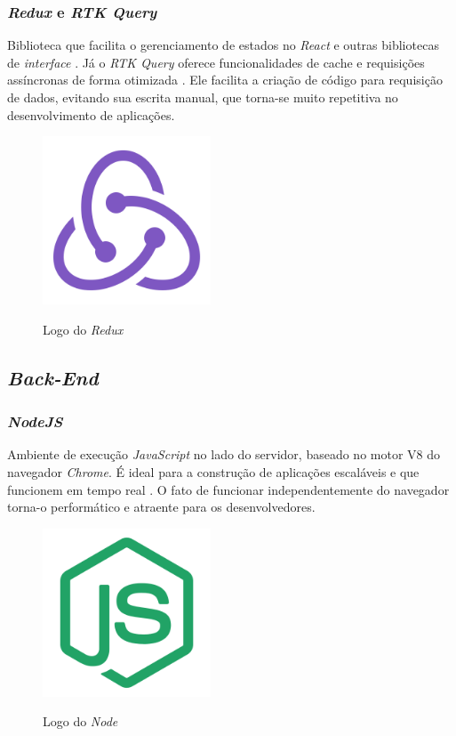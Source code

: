 \subsubsection{\emph{Redux} e \emph{RTK Query}} 
Biblioteca que facilita o gerenciamento de estados no \emph{React} e outras bibliotecas de \emph{interface }\cite{redux}. Já o \emph{RTK Query} oferece funcionalidades de cache e requisições assíncronas de forma otimizada \cite{rtk-query}. Ele facilita a criação de código para requisição de dados, evitando sua escrita manual, que torna-se muito repetitiva no desenvolvimento de aplicações. 

\begin{figure}[htb]
	\centering
	\caption{Logo do \emph{Redux}}
	\includegraphics[width=5cm]{cap04-desenvolvimento/images/4-4-1-3-redux-logo.png}
	\label{fig:redux-logo}
\end{figure}
\FloatBarrier

\subsection{\emph{Back-End}} 

\subsubsection{\emph{NodeJS}} 
Ambiente de execução \emph{JavaScript} no lado do servidor, baseado no motor V8 do navegador \emph{Chrome}. É ideal para a construção de aplicações escaláveis e que funcionem em tempo real \cite{node}. O fato de funcionar independentemente do navegador torna-o performático e atraente para os desenvolvedores.

\begin{figure}[htb]
	\centering
	\caption{Logo do \emph{Node}}
	\includegraphics[width=5cm]{cap04-desenvolvimento/images/4-4-2-1-node-logo.png}
	\label{fig:node-logo}
\end{figure}
\FloatBarrier

